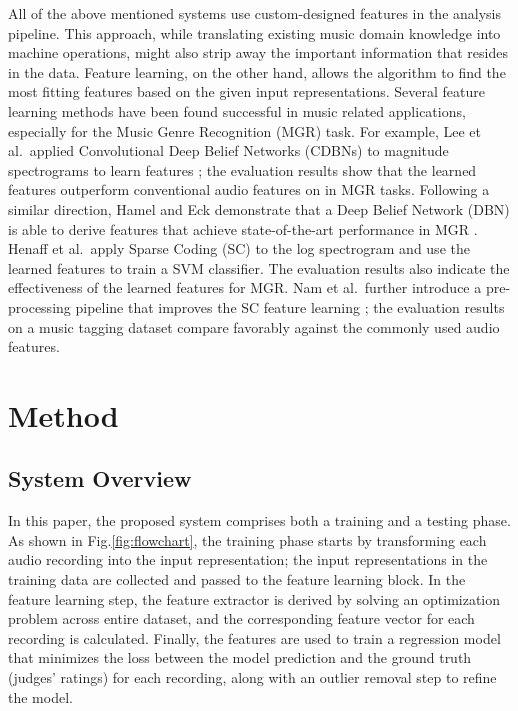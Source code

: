 \documentclass[conference]{IEEEtran}
\begin{document}
All of the above mentioned systems use custom-designed features in the analysis pipeline. This approach, while translating existing music domain knowledge into machine operations, might also strip away the important information that resides in the data. Feature learning, on the other hand, allows the algorithm to find the most fitting features based on the given input representations. Several feature learning methods have been found successful in music related applications, especially for the Music Genre Recognition (MGR) task. For example, Lee et al.\  applied Convolutional Deep Belief Networks (CDBNs) to magnitude spectrograms to learn features \cite{Lee2009a}; the evaluation results show that the learned features outperform conventional audio features on in MGR tasks. Following a similar direction, Hamel and Eck demonstrate that a Deep Belief Network (DBN) is able to derive features that achieve state-of-the-art performance in MGR \cite{Hamel2010}. Henaff et al.\  apply Sparse Coding (SC) to the log spectrogram and use the learned features to train a SVM classifier. The evaluation results also indicate the effectiveness of the learned features for MGR. Nam et al.\  further introduce a pre-processing pipeline that improves the SC feature learning \cite{Nam2012}; the evaluation results on a music tagging dataset compare favorably against the commonly used audio features.  


\section{Method}\label{sec:method}
\subsection{System Overview}
In this paper, the proposed system comprises both a training and a testing phase. As shown in Fig.\ref{fig:flowchart}, the training phase starts by transforming each audio recording into the input representation; the input representations in the training data are collected and passed to the feature learning block. In the feature learning step, the feature extractor is derived by solving an optimization problem across entire dataset, and the corresponding feature vector for each recording is calculated. Finally, the features are used to train a regression model that minimizes the loss between the model prediction and the ground truth (judges' ratings) for each recording, along with an outlier removal step to refine the model. 
\end{document}
